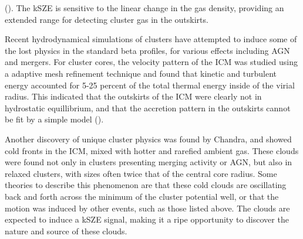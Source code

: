 \documentclass[manuscript]{aastex}
\begin{document}



(\cite{Reiprich2013}). The kSZE is sensitive to the linear change in the gas density, providing an extended range for detecting cluster gas in the outskirts. 

Recent hydrodynamical simulations of clusters have attempted to induce some of the lost physics in the standard beta profiles, for various effects including AGN and mergers. For cluster cores, the velocity pattern of the ICM was studied using a adaptive mesh refinement technique and found that kinetic and turbulent energy accounted for 5-25 percent of the total thermal energy inside of the virial radius. This indicated that the outskirts of the ICM were clearly not in hydrostatic equillibrium, and that the accretion pattern in the outskirts cannot be fit by a simple model (\cite{Reiprich2013}).  

Another discovery of unique cluster physics was found by Chandra, and showed cold fronts in the ICM, mixed with hotter and rarefied ambient gas. These clouds were found not only in clusters presenting merging activity or AGN, but also in relaxed clusters, with sizes often twice that of the central core radius. Some theories to describe this phenomenon are that these cold clouds are oscillating back and forth across the minimum of the cluster potential well, or that the motion was induced by other events, such as those listed above. The clouds are expected to induce a kSZE signal, making it a ripe opportunity to discover the nature and source of these clouds. 
\end{document}
